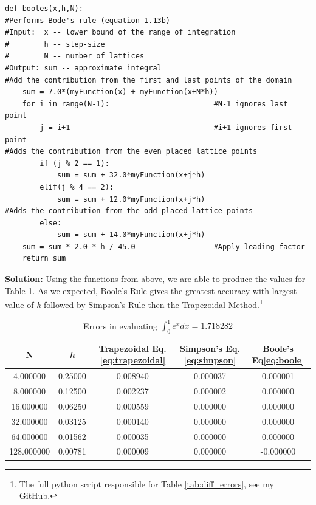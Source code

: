 \documentclass[10pt]{article}
\begin{document}
\begin{lstlisting}
def booles(x,h,N):
#Performs Bode's rule (equation 1.13b)
#Input:  x -- lower bound of the range of integration
#        h -- step-size
#        N -- number of lattices
#Output: sum -- approximate integral 
#Add the contribution from the first and last points of the domain
    sum = 7.0*(myFunction(x) + myFunction(x+N*h))
    for i in range(N-1):						#N-1 ignores last point
        j = i+1        						    #i+1 ignores first point
#Adds the contribution from the even placed lattice points        
        if (j % 2 == 1):
            sum = sum + 32.0*myFunction(x+j*h)
        elif(j % 4 == 2):
            sum = sum + 12.0*myFunction(x+j*h)
#Adds the contribution from the odd placed lattice points            
        else:
            sum = sum + 14.0*myFunction(x+j*h)                    
    sum = sum * 2.0 * h / 45.0                  #Apply leading factor
    return sum
\end{lstlisting}
\label{solution:1.2}\textbf{Solution:}
Using the functions from above, we are able to produce the values for Table \ref{tab:quad_errors}. As we expected, Boole's Rule gives the greatest accuracy with largest value of \textit{h} followed by Simpson's Rule then the Trapezoidal Method.\footnote{The full python script responsible for Table \ref{tab:diff_errors}, see my \href{https://github.com/jmelahman/computational-physics-solutions/blob/master/exercises_python/Chapter\%201/exercise1_2.py}{GitHub}.} 
\begin{table}[!ht]
	\begin{center}
	\caption{Errors in evaluating $\int^1_0 e^x dx = 1.718282$ }
		\label{tab:quad_errors}
		\begin{tabular}{|ccccc|}
		\hline
		N & \textit{h} & Trapezoidal Eq.\ref{eq:trapezoidal} & Simpson's Eq.\ref{eq:simpson} & Boole's Eq\ref{eq:boole} \\
		\hline
		4.000000&0.25000&0.008940&0.000037&0.000001\\ 
		8.000000&0.12500&0.002237&0.000002&0.000000\\ 
		16.000000&0.06250&0.000559&0.000000&0.000000\\ 
		32.000000&0.03125&0.000140&0.000000&0.000000\\ 
		64.000000&0.01562&0.000035&0.000000&0.000000\\ 
		128.000000&0.00781&0.000009&0.000000&-0.000000\\ 
		\hline
		\end{tabular}
	\end{center}
\end{table} 
\end{document}
